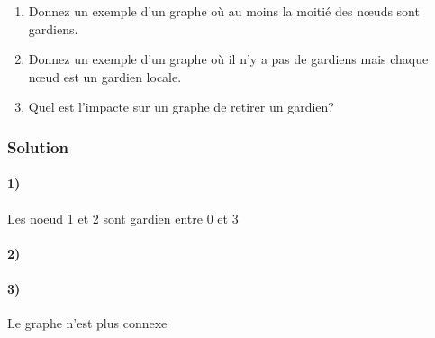 \begin{enumerate}
\item Donnez un exemple d'un graphe o\`{u} au moins la moiti\'{e} des n\oe{}uds sont
gardiens.
\item Donnez un exemple d'un graphe o\`{u} il n'y a pas de gardiens mais chaque n\oe{}ud est un gardien locale.
\item Quel est l'impacte sur un graphe de retirer un gardien?
\end{enumerate}

\subsubsection*{Solution}
\paragraph{1)} Les noeud 1 et 2 sont gardien entre 0 et 3 

\begin{center}  
\end{center}

\paragraph{2)} 

\begin{center}  
\end{center}

\paragraph{3)} Le graphe n'est plus connexe


